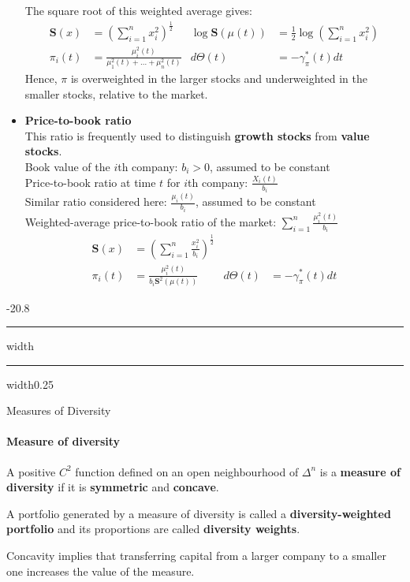 \documentclass[a4paper,landscape,8pt,fleqn]{scrartcl}
\makeatletter
\renewcommand{\emph}[1]{\textbf{#1}}
\renewcommand{\section}{\@startsection{section}{1}{0mm}%
{-2\baselineskip}{0.8\baselineskip}%
{\hrule depth 0.2pt width\columnwidth\hrule depth1.5pt
width0.25\columnwidth\vspace*{1.2em}\Large\bfseries}}
\makeatother
\begin{document}
\begin{multicols*}{3}
\begin{itemize}
The square root of this weighted average gives:
\begin{align*}
\pmb{S}(x) &= \left( \sum_{i=1}^n x_i^2 \right)^{\frac{1}{2}} &
\log \pmb{S}(\mu(t)) &= \frac{1}{2} \log \left( \sum_{i=1}^n x_i^2 \right) \\
\pi_i(t) &= \frac{\mu_i^2(t)}{\mu_1^2(t) + \ldots + \mu_n^2(t)} &
d\Theta(t) &= -\gamma_\pi^\ast(t) dt
\end{align*}
Hence, $\pi$ is overweighted in the larger stocks and underweighted in the smaller stocks, relative to the market.
\item \emph{Price-to-book ratio} \\
This ratio is frequently used to distinguish \emph{growth stocks} from \emph{value stocks}. \\
Book value of the $i$th company: $b_i > 0$, assumed to be constant \\
Price-to-book ratio at time $t$ for $i$th company: $\frac{X_i(t)}{b_i}$ \\
Similar ratio considered here: $\frac{\mu_i(t)}{b_i}$, assumed to be constant \\
Weighted-average price-to-book ratio of the market: $\sum_{i=1}^n \frac{\mu_i^2(t)}{b_i}$
\begin{align*}
\pmb{S}(x) &= \left( \sum_{i=1}^n \frac{x_i^2}{b_i} \right)^\frac{1}{2} \\
\pi_i(t) &= \frac{\mu_i^2(t)}{b_i \pmb{S}^2(\mu(t))} & d\Theta(t) &= -\gamma_\pi^\ast(t) dt
\end{align*}
\end{itemize}

\columnbreak

\section{Measures of Diversity}

\paragraph{Measure of diversity}

A positive $C^2$ function defined on an open neighbourhood of $\Delta^n$ is a \emph{measure of diversity} if it is \emph{symmetric} and \emph{concave}.

A portfolio generated by a measure of diversity is called a \emph{diversity-weighted portfolio} and its proportions are called \emph{diversity weights}.

Concavity implies that transferring capital from a larger company to a smaller one increases the value of the measure.


\end{multicols*}
\end{document}
